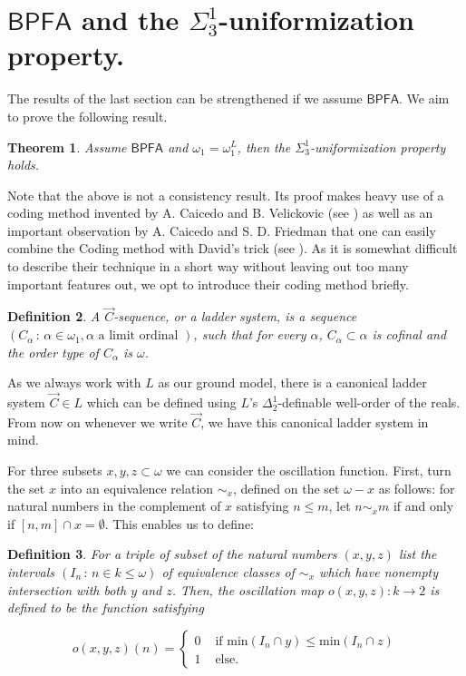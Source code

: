 \documentclass[a4paper,12pt]{article}
\newtheorem{theorem}{Theorem}[section]
\newtheorem{definition}[theorem]{Definition}
\newcommand{\BPFA}{\mathsf{BPFA}}
\begin{document}
\section{$\BPFA$ and the $\Sigma^1_3$-uniformization property.}

The results of the last section can be strengthened if we assume $\BPFA$.
We aim to prove the following result.
\begin{theorem}
Assume $\BPFA$ and $\omega_1=\omega_1^L$, then the $\Sigma^1_3$-uniformization property holds.
\end{theorem}
Note that the above is not a consistency result. Its proof makes heavy use of a coding method invented by A. Caicedo and B. Velickovic (see \cite{CV}) as well as an important observation by A. Caicedo and S. D. Friedman that one can easily combine the Coding method with David's trick (see \cite{SyAndres}). As it is somewhat difficult to describe their technique in a short way without leaving out too many important features out, we opt to introduce their coding method briefly. 

\begin{definition}
A $\vec{C}$-sequence, or a ladder system, is a sequence $(C_{\alpha} \, : \, \alpha \in \omega_1, \alpha \text{ a limit ordinal })$, such
that for every $\alpha$, $C_{\alpha} \subset \alpha$ is cofinal and the order type of $C_{\alpha}$ is $\omega$.
\end{definition}
As we always work with $L$ as our ground model, there is a canonical ladder system $\vec{C} \in L$ which can be defined using $L$'s $\Delta^1_2$-definable well-order of the reals. From now on whenever we write $\vec{C}$, we have this canonical ladder system in mind.

For three subsets $x,y,z \subset \omega$ we can consider the oscillation function. First, turn the set $x$ 
into an equivalence relation $\sim_x$, defined on the set $\omega- x$ as follows: for natural numbers in the 
complement of $x$ satisfying $n \le m$, let $n \sim_x m$ if and only if $[n,m] \cap x = \emptyset$.
This enables us to define:
\begin{definition}
For a triple of subset of the natural numbers $(x,y,z)$ list the intervals $(I_n \, :\, n \in k \le \omega)$ of equivalence classes of
$\sim_x$ which have nonempty intersection with both $y$ and $z$. Then, the oscillation map $o(x,y,z):
k \rightarrow 2$ is defined to be the function satisfying

\begin{equation*}
o(x,y,z)(n) = \begin{cases}
0  & \text{ if min}(I_n \cap y) \le \text{min}(I_n \cap z) \\ 1 & \text{ else.}
\end{cases}
\end{equation*}

\end{definition}
\end{document}
